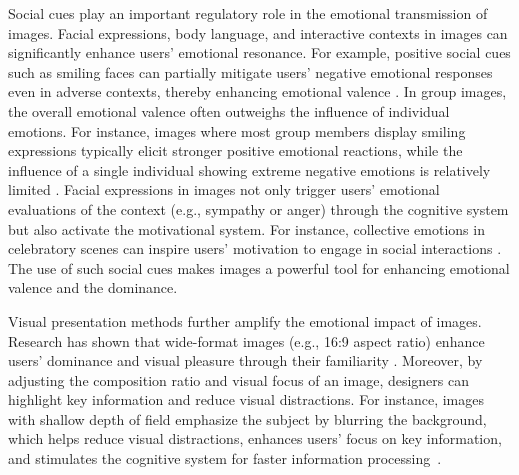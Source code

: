 Social cues play an important regulatory role in the emotional transmission of images. Facial expressions, body language, and interactive contexts in images can significantly enhance users’ emotional resonance. For example, positive social cues such as smiling faces can partially mitigate users’ negative emotional responses even in adverse contexts, thereby enhancing emotional valence \cite{dudarev2024social}. In group images, the overall emotional valence often outweighs the influence of individual emotions. For instance, images where most group members display smiling expressions typically elicit stronger positive emotional reactions, while the influence of a single individual showing extreme negative emotions is relatively limited \cite{hao2024judging}. Facial expressions in images not only trigger users’ emotional evaluations of the context (e.g., sympathy or anger) through the cognitive system but also activate the motivational system. For instance, collective emotions in celebratory scenes can inspire users’ motivation to engage in social interactions \cite{hou2024emotional}. The use of such social cues makes images a powerful tool for enhancing emotional valence and the dominance.

Visual presentation methods further amplify the emotional impact of images. Research has shown that wide-format images (e.g., 16:9 aspect ratio) enhance users’ dominance and visual pleasure through their familiarity \cite{kuzinas2024creative}. Moreover, by adjusting the composition ratio and visual focus of an image, designers can highlight key information and reduce visual distractions. For instance, images with shallow depth of field emphasize the subject by blurring the background, which helps reduce visual distractions, enhances users’ focus on key information, and stimulates the cognitive system for faster information processing~\cite{datta2006studying}.

